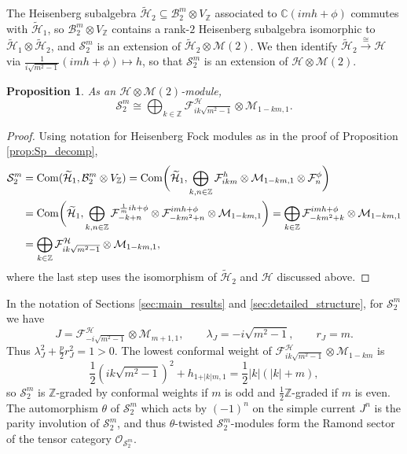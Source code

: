\documentclass[11pt, reqno]{amsart}
\newtheorem{prop}[thm]{Proposition}
\theoremstyle{definition}\newtheorem{defi}[thm]{Definition}
\theoremstyle{definition}\newtheorem{rem}[thm]{Remark}
\theoremstyle{definition}\newtheorem{exam}[thm]{Example}
\theoremstyle{definition}\newtheorem{assum}[thm]{Assumption}
\newcommand{\cB}{\mathcal{B}}
\newcommand{\cH}{\mathcal{H}}
\newcommand{\cM}{\mathcal{M}}
\newcommand{\cS}{\mathcal{S}}
\newcommand{\cF}{\mathcal{F}}
\newcommand{\cO}{\mathcal{O}}
\newcommand{\til}{\widetilde}
\newcommand{\CC}{\mathbb{C}}
\newcommand{\ZZ}{\mathbb{Z}}
\begin{document}
 The Heisenberg subalgebra $\widetilde{\cH}_2\subseteq\cB_2^m\otimes V_\ZZ$ associated to $\CC(imh+\phi)$ commutes with $\til{\cH}_1$, so $\cB_2^m\otimes V_\ZZ$ contains a rank-$2$ Heisenberg subalgebra isomorphic to $\til{\cH}_1\otimes\til{\cH}_2$, and $\cS_2^m$ is an extension of $\til{\cH}_2\otimes\cM(2)$. We then identify $\til{\cH}_2\xrightarrow{\cong}\cH$ via $\frac{1}{i\sqrt{m^2-1}}(imh+\phi)\mapsto h$, so that $\cS_2^m$ is an extension of $\cH\otimes\cM(2)$.
 
\begin{prop}\label{prop:sl1m}
As an $\cH\otimes\cM(2)$-module,
\begin{equation}
\cS_2^m \cong \bigoplus_{k \in \ZZ} \cF^{\cH}_{ik\sqrt{m^2-1}} \otimes \cM_{1-km,1}.
\end{equation}
\end{prop}
\begin{proof}
Using notation for Heisenberg Fock modules as in the proof of Proposition \ref{prop:Sp_decomp},
\begin{align*}
\cS_2^m & = {\rm Com}(\widetilde{\cH}_1, \cB_2^m\otimes V_{\ZZ}) = {\rm Com}\bigg(\widetilde{\cH}_1, \bigoplus_{k,n\in\ZZ} \cF^{h}_{ikm}\otimes\cM_{1-km,1}\otimes \cF^{\phi}_n\bigg) \\
& = {\rm Com}\bigg(\widetilde{\cH}_1, \bigoplus_{k,n\in\ZZ} \cF^{\frac{1}{m}ih+\phi}_{-k+n}\otimes \cF^{imh+\phi}_{-km^2+n}\otimes\cM_{1-km,1}\bigg)  = \bigoplus_{k\in\ZZ} \cF^{imh+\phi}_{-km^2+k} \otimes  \cM_{1-km,1}\\
& = \bigoplus_{k \in \ZZ} \cF^{\cH}_{ik\sqrt{m^2-1}} \otimes \cM_{1-km,1},
\end{align*}
where the last step uses the isomorphism of $\til{\cH}_2$ and $\cH$ discussed above.
\end{proof}


In the notation of Sections \ref{sec:main_results} and \ref{sec:detailed_structure}, for $\cS_2^m$ we have
\begin{equation*}
J=\cF^\cH_{-i\sqrt{m^2-1}}\otimes\cM_{m+1,1},\qquad \lambda_J=-i\sqrt{m^2-1},\qquad r_J=m.
\end{equation*}
Thus $\lambda_J^2+\frac{p}{2} r_J^2= 1 >0$. The lowest conformal weight of $\cF^\cH_{ik\sqrt{m^2-1}}\otimes\cM_{1-km}$ is
\begin{equation*}
\frac{1}{2}(ik\sqrt{m^2-1})^2+h_{1+\vert k\vert m,1} =\frac{1}{2}\vert k\vert(\vert k\vert +m),
\end{equation*}
so $\cS_2^m$ is $\ZZ$-graded by conformal weights if $m$ is odd and $\frac{1}{2}\ZZ$-graded if $m$ is even. The automorphism $\theta$ of $\cS_2^m$ which acts by $(-1)^n$ on the simple current $J^n$ is the parity involution of $\cS_2^m$, and thus $\theta$-twisted $\cS_2^m$-modules form the Ramond sector of the tensor category $\cO_{\cS_2^m}$.
\end{document}

